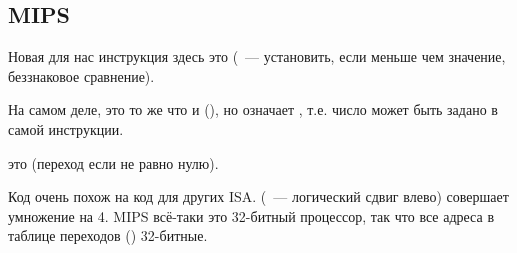 \subsection{MIPS}



Новая для нас инструкция здесь это  (~--- установить,
если меньше чем значение, беззнаковое сравнение).

На самом деле, это то же что и  (), но  означает ,
т.е. число может быть задано в самой инструкции.

 это  (переход если не равно нулю).

Код очень похож на код для других \ac{ISA}.
 (~--- логический сдвиг влево) совершает умножение на 4.
MIPS всё-таки это 32-битный процессор, так что все адреса в таблице переходов () 32-битные.

